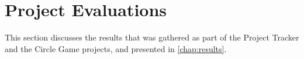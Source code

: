 
\section{Project Evaluations}
\label{sec:disc:project_evaluations}

This section discusses the results that was gathered as part of the Project Tracker and the Circle Game projects, and presented in \autoref{chap:results}.